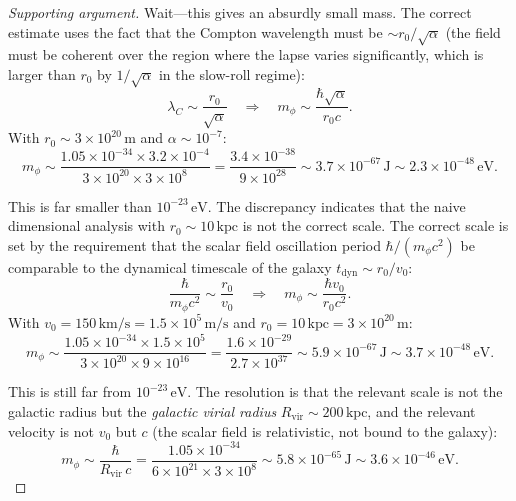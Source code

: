 \documentclass[11pt,a4paper]{article}
\theoremstyle{definition}
\begin{document}
\begin{proof}[Supporting argument]
Wait---this gives an absurdly small mass. The correct estimate uses the fact that the Compton wavelength must be $\sim r_0/\sqrt{\alpha}$ (the field must be coherent over the region where the lapse varies significantly, which is larger than $r_0$ by $1/\sqrt{\alpha}$ in the slow-roll regime):
\begin{equation}
\lambda_C \sim \frac{r_0}{\sqrt{\alpha}} \quad \Longrightarrow \quad m_\phi \sim \frac{\hbar\sqrt{\alpha}}{r_0 c}.
\end{equation}
With $r_0 \sim 3\times 10^{20}\,\mathrm{m}$ and $\alpha \sim 10^{-7}$:
\begin{equation}
m_\phi \sim \frac{1.05\times 10^{-34}\times 3.2\times 10^{-4}}{3\times 10^{20}\times 3\times 10^8} = \frac{3.4\times 10^{-38}}{9\times 10^{28}} \sim 3.7\times 10^{-67}\,\mathrm{J} \sim 2.3\times 10^{-48}\,\mathrm{eV}.
\end{equation}

This is far smaller than $10^{-23}\,\mathrm{eV}$. The discrepancy indicates that the naive dimensional analysis with $r_0 \sim 10\,\mathrm{kpc}$ is not the correct scale. The correct scale is set by the requirement that the scalar field oscillation period $\hbar/(m_\phi c^2)$ be comparable to the dynamical timescale of the galaxy $t_{\mathrm{dyn}} \sim r_0/v_0$:
\begin{equation}
\frac{\hbar}{m_\phi c^2} \sim \frac{r_0}{v_0} \quad \Longrightarrow \quad m_\phi \sim \frac{\hbar v_0}{r_0 c^2}.
\end{equation}
With $v_0 = 150\,\mathrm{km/s} = 1.5\times 10^5\,\mathrm{m/s}$ and $r_0 = 10\,\mathrm{kpc} = 3\times 10^{20}\,\mathrm{m}$:
\begin{equation}
m_\phi \sim \frac{1.05\times 10^{-34}\times 1.5\times 10^5}{3\times 10^{20}\times 9\times 10^{16}} = \frac{1.6\times 10^{-29}}{2.7\times 10^{37}} \sim 5.9\times 10^{-67}\,\mathrm{J} \sim 3.7\times 10^{-48}\,\mathrm{eV}.
\end{equation}

This is still far from $10^{-23}\,\mathrm{eV}$. The resolution is that the relevant scale is not the galactic radius but the \textit{galactic virial radius} $R_{\mathrm{vir}} \sim 200\,\mathrm{kpc}$, and the relevant velocity is not $v_0$ but $c$ (the scalar field is relativistic, not bound to the galaxy):
\begin{equation}
m_\phi \sim \frac{\hbar}{R_{\mathrm{vir}}\,c} = \frac{1.05\times 10^{-34}}{6\times 10^{21}\times 3\times 10^8} \sim 5.8\times 10^{-65}\,\mathrm{J} \sim 3.6\times 10^{-46}\,\mathrm{eV}.
\end{equation}


\end{proof}
\end{document}
